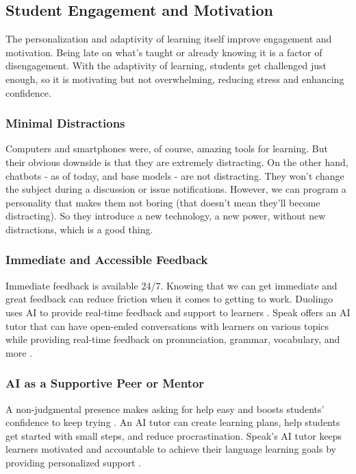 \documentclass{article}
\begin{document}
\subsection{Student Engagement and Motivation}

The personalization and adaptivity of learning itself improve engagement and motivation. Being late on what's taught or already knowing it is a factor of disengagement. With the adaptivity of learning, students get challenged just enough, so it is motivating but not overwhelming, reducing stress and enhancing confidence.

\subsubsection{Minimal Distractions}

Computers and smartphones were, of course, amazing tools for learning. But their obvious downside is that they are extremely distracting. On the other hand, chatbots - as of today, and base models - are not distracting. They won't change the subject during a discussion or issue notifications. However, we can program a personality that makes them not boring (that doesn't mean they'll become distracting). So they introduce a new technology, a new power, without new distractions, which is a good thing.

\subsubsection{Immediate and Accessible Feedback}

Immediate feedback is available 24/7. Knowing that we can get immediate and great feedback can reduce friction when it comes to getting to work. Duolingo uses AI to provide real-time feedback and support to learners \cite{https://www.forbes.com/sites/bernardmarr/2023/04/28/the-amazing-ways-duolingo-is-using-ai-and-gpt-4/?sh=6f4d48181346}. Speak offers an AI tutor that can have open-ended conversations with learners on various topics while providing real-time feedback on pronunciation, grammar, vocabulary, and more \cite{https://www.speak.com/}.

\subsubsection{AI as a Supportive Peer or Mentor}

A non-judgmental presence makes asking for help easy and boosts students' confidence to keep trying \cite{https://link.springer.com/article/10.1007/s10639-022-11177-3}. An AI tutor can create learning plans, help students get started with small steps, and reduce procrastination. Speak's AI tutor keeps learners motivated and accountable to achieve their language learning goals by providing personalized support \cite{https://www.speak.com/}.
\end{document}
